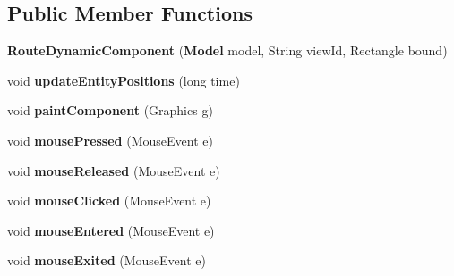 \subsection*{Public Member Functions}
\begin{DoxyCompactItemize}
\item 
{\bfseries Route\-Dynamic\-Component} ({\bf Model} model, String view\-Id, Rectangle bound)\label{classdesmoj_1_1extensions_1_1visualization2d_1_1engine_1_1model_grafic_1_1_route_dynamic_component_a60e97ab8e108e3598b7746278b418705}

\item 
void {\bfseries update\-Entity\-Positions} (long time)\label{classdesmoj_1_1extensions_1_1visualization2d_1_1engine_1_1model_grafic_1_1_route_dynamic_component_aca153f22b6c1190a436665f20ea36e32}

\item 
void {\bfseries paint\-Component} (Graphics g)\label{classdesmoj_1_1extensions_1_1visualization2d_1_1engine_1_1model_grafic_1_1_route_dynamic_component_a829c8d8d83fbc4a8fe89d6ac8d0faad3}

\item 
void {\bfseries mouse\-Pressed} (Mouse\-Event e)\label{classdesmoj_1_1extensions_1_1visualization2d_1_1engine_1_1model_grafic_1_1_route_dynamic_component_a055a863dcce77187a9e112073db470eb}

\item 
void {\bfseries mouse\-Released} (Mouse\-Event e)\label{classdesmoj_1_1extensions_1_1visualization2d_1_1engine_1_1model_grafic_1_1_route_dynamic_component_a5840ecc6312f9e56c202501c674672e7}

\item 
void {\bfseries mouse\-Clicked} (Mouse\-Event e)\label{classdesmoj_1_1extensions_1_1visualization2d_1_1engine_1_1model_grafic_1_1_route_dynamic_component_a902ba2c7d1bb72b358e51af94852012d}

\item 
void {\bfseries mouse\-Entered} (Mouse\-Event e)\label{classdesmoj_1_1extensions_1_1visualization2d_1_1engine_1_1model_grafic_1_1_route_dynamic_component_a89361b4e7fa724db0630fb3ffc89424e}

\item 
void {\bfseries mouse\-Exited} (Mouse\-Event e)\label{classdesmoj_1_1extensions_1_1visualization2d_1_1engine_1_1model_grafic_1_1_route_dynamic_component_a37aefb1ce9c4e1c9013a11daf68f3b68}

\end{DoxyCompactItemize}


